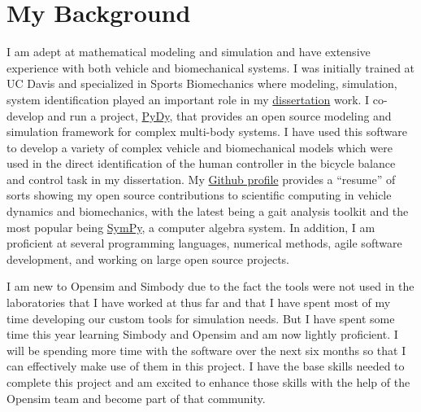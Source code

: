 \documentclass[11pt]{article}
\begin{document}
\section*{My Background}

I am adept at mathematical modeling and simulation and have extensive
experience with both vehicle and biomechanical systems. I was initially trained
at UC Davis and specialized in Sports Biomechanics where modeling, simulation,
system identification played an important role in my
\href{http://moorepants.github.io/dissertation}{dissertation} work. I
co-develop and run a project, \href{http://pydy.org}{PyDy}, that provides an
open source modeling and simulation framework for complex multi-body systems.
I have used this software to develop a variety of complex vehicle and
biomechanical models which were used in the direct identification of the human
controller in the bicycle balance and control task in my dissertation. My
\href{http://github.com/moorepants}{Github profile} provides a ``resume'' of
sorts showing my open source contributions to scientific computing in vehicle
dynamics and biomechanics, with the latest being a gait analysis toolkit and
the most popular being \href{http://www.sympy.org}{SymPy}, a computer algebra
system. In addition, I am proficient at several programming languages,
numerical methods, agile software development, and working on large open source
projects.

I am new to Opensim and Simbody due to the fact the tools were not used in the
laboratories that I have worked at thus far and that I have spent most of my
time developing our custom tools for simulation needs. But I have spent some
time this year learning Simbody and Opensim and am now lightly proficient. I
will be spending more time with the software over the next six months so that I
can effectively make use of them in this project. I have the base skills needed
to complete this project and am excited to enhance those skills with the help
of the Opensim team and become part of that community.



\end{document}

